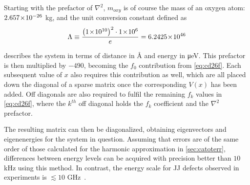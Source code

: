 Starting with the prefactor of $\nabla^2$, $m_{oxy}$ is of course the mass of an oxygen atom: $2.657\!\times\!10^{-26}$ kg, and the unit conversion constant defined as
\begin{equation}
    \Lambda \equiv \frac{\left(1\!\times\!10^{10}\right)^2\cdot1\!\times\!10^{6}}{e} = 6.2425\!\times\!10^{46}\label{eq:lambda}
\end{equation}

describes the system in terms of distance in Å and energy in μeV.
This prefactor is then multiplied by $-490$, becoming the $f_0$ contribution from \cref{eq:cd26f}.
Each subsequent value of $x$ also requires this contribution as well, which are all placed down the diagonal of a sparse matrix once the corresponding $V(x)$ has been added.
Off diagonals are also required to fulfil the remaining $f_k$ values in \cref{eq:cd26f}, where the $k^{th}$ off diagonal holds the $f_k$ coefficient and the  $\nabla^2$ prefactor.

The resulting matrix can then be diagonalized, obtaining eigenvectors and eigenenergies for the system in question.
Assuming that errors are of the same order of those calculated for the harmonic approximation in \cref{sec:catoterr}, differences between energy levels can be acquired with precision better than $10$ kHz using this method.
In contrast, the energy scale for JJ defects observed in experiments is $\lesssim 10$ GHz~\cite{Neeley2008, Lupascu2009, Lisenfeld2010}.
